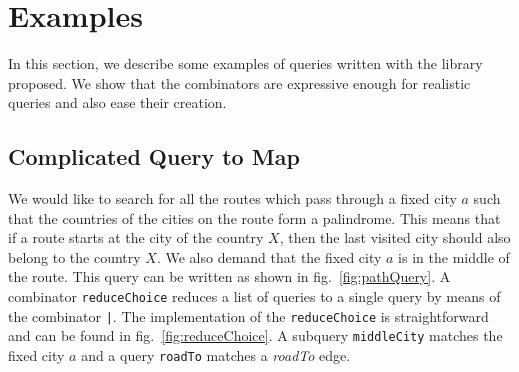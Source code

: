 \section{Examples}
\label{sec:examples}

In this section, we describe some examples of queries written with the library proposed.
We show that the combinators are expressive enough for realistic queries and also ease their creation.


\subsection{Complicated Query to Map}

We would like to search for all the routes which pass through a fixed city $a$ such that the countries of the cities on the route form a palindrome. 
This means that if a route starts at the city of the country $X$, then the last visited city should also belong to the country $X$. 
We also demand that the fixed city $a$ is in the middle of the route. 
This query can be written as shown in fig.~\ref{fig:pathQuery}.
A combinator \lstinline{reduceChoice} reduces a list of queries to a single query by means of the combinator \lstinline{|}.
The implementation of the \lstinline{reduceChoice} is straightforward and can be found in fig.~\ref{fig:reduceChoice}. 
A subquery \lstinline{middleCity} matches the fixed city $a$ and a query \lstinline{roadTo} matches a \emph{roadTo} edge.

%

